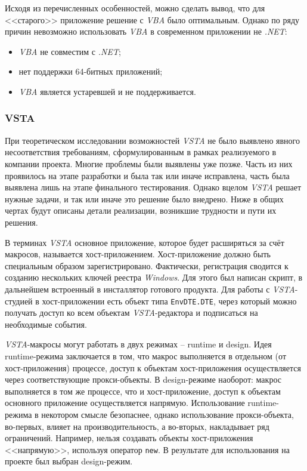 Исходя из перечисленных особенностей, можно сделать вывод, что для <<старого>> приложение решение с {\it VBA} было оптимальным. Однако по ряду причин невозможно использовать {\it VBA} в современном приложении не {\it .NET}:

\begin{itemize}
   \item {\it VBA} не совместим с {\it .NET};
   \item нет поддержки 64-битных приложений;
   \item {\it VBA} является устаревшей и не поддерживается.
\end{itemize}


\subsubsection{VSTA}
\label{sec:use-itm-vsta}

При теоретическом исследовании возможностей {\it VSTA} не было выявлено явного несоответствия требованиям, сформулированным в рамках реализуемого в компании проекта. Многие проблемы были выявлены уже позже. Часть из них проявилось на этапе разработки и была так или иначе исправлена, часть была выявлена лишь на этапе финального тестирования. Однако вцелом {\it VSTA} решает нужные задачи, и так или иначе это решение было внедрено. Ниже в общих чертах будут описаны детали реализации, возникшие трудности и пути их решения.

В терминах {\it VSTA} основное приложение, которое будет расширяться за счёт макросов, называется хост-приложением. Хост-приложение должно быть специальным образом зарегистрировано. Фактически, регистрация сводится к созданию нескольких ключей реестра {\it Windows}. Для этого был написан скрипт, в дальнейшем встроенный в инсталлятор готового продукта. Для работы с {\it VSTA}-студией в хост-приложении есть объект типа {\tt EnvDTE.DTE}, через который можно получать доступ ко всем объектам {\it VSTA}-редактора и подписаться на необходимые события.

{\it VSTA}-макросы могут работать в двух режимах – runtime и design. Идея runtime-режима заключается в том, что макрос выполняется в отдельном (от хост-приложения) процессе, доступ к объектам хост-приложения осуществляется через соответствующие прокси-объекты. В design-режиме наоборот: макрос выполняется в том же процессе, что и хост-приложение, доступ к объектам основного приложение осуществляется напрямую. Использование runtime-режима в некотором смысле безопаснее, однако использование прокси-объекта, во-первых, влияет на производительность, а во-вторых, накладывает ряд ограничений. Например, нельзя создавать объекты хост-приложения <<напрямую>>, используя оператор {\tt new}. В результате для использования на проекте был выбран design-режим.

